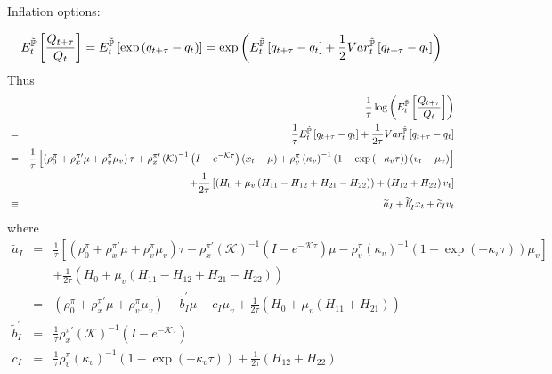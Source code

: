 \documentclass{article}
\begin{document}
Inflation options:

\begin{equation*}
E_{t}^{\mathbb{\tilde{P}}}\left[ \frac{Q_{t+\tau }}{Q_{t}}\right] =E_{t}^{%
\mathbb{\tilde{P}}}\left[ \exp \left( q_{t+\tau }-q_{t}\right) \right] =\exp
\left( E_{t}^{\mathbb{\tilde{P}}}\left[ q_{t+\tau }-q_{t}\right] +\frac{1}{2}%
Var_{t}^{\mathbb{\tilde{P}}}\left[ q_{t+\tau }-q_{t}\right] \right) 
\end{equation*}%
Thus%
\begin{eqnarray*}
&&\frac{1}{\tau }\log \left( E_{t}^{\mathbb{\tilde{P}}}\left[ \frac{%
Q_{t+\tau }}{Q_{t}}\right] \right)  \\
&=&\frac{1}{\tau }E_{t}^{\mathbb{\tilde{P}}}\left[ q_{t+\tau }-q_{t}\right] +%
\frac{1}{2\tau }Var_{t}^{\mathbb{\tilde{P}}}\left[ q_{t+\tau }-q_{t}\right] 
\\
&=&\frac{1}{\tau }\left[ \left( \rho _{0}^{\pi }+\rho _{x}^{\pi \prime }\mu
+\rho _{v}^{\pi }\mu _{v}\right) \tau +\rho _{x}^{\pi \prime }\left( 
\mathcal{K}\right) ^{-1}\left( I-e^{-\mathcal{K}\tau }\right) \left(
x_{t}-\mu \right) +\rho _{v}^{\pi }\left( \kappa _{v}\right) ^{-1}\left(
1-\exp \left( -\kappa _{v}\tau \right) \right) \left( v_{t}-\mu _{v}\right) %
\right]  \\
&&+\frac{1}{2\tau }\left[ \left( H_{0}+\mu _{v}\left(
H_{11}-H_{12}+H_{21}-H_{22}\right) \right) +\left( H_{12}+H_{22}\right) v_{t}%
\right]  \\
&\equiv &\widetilde{a}_{I}+\widetilde{b}_{I}^{\prime }x_{t}+\widetilde{c}%
_{I}v_{t}
\end{eqnarray*}%
where%
\begin{eqnarray*}
\widetilde{a}_{I} &=&\frac{1}{\tau }\left[ \left( \rho _{0}^{\pi }+\rho
_{x}^{\pi \prime }\mu +\rho _{v}^{\pi }\mu _{v}\right) \tau -\rho _{x}^{\pi
\prime }\left( \mathcal{K}\right) ^{-1}\left( I-e^{-\mathcal{K}\tau }\right)
\mu -\rho _{v}^{\pi }\left( \kappa _{v}\right) ^{-1}\left( 1-\exp \left(
-\kappa _{v}\tau \right) \right) \mu _{v}\right]  \\
&&+\frac{1}{2\tau }\left( H_{0}+\mu _{v}\left(
H_{11}-H_{12}+H_{21}-H_{22}\right) \right)  \\
&=&\left( \rho _{0}^{\pi }+\rho _{x}^{\pi \prime }\mu +\rho _{v}^{\pi }\mu
_{v}\right) -\widetilde{b}_{I}^{\prime }\mu -c_{I}\mu _{v}+\frac{1}{2\tau }%
\left( H_{0}+\mu _{v}\left( H_{11}+H_{21}\right) \right)  \\
\widetilde{b}_{I}^{\prime } &=&\frac{1}{\tau }\rho _{x}^{\pi \prime }\left( 
\mathcal{K}\right) ^{-1}\left( I-e^{-\mathcal{K}\tau }\right)  \\
\widetilde{c}_{I} &=&\frac{1}{\tau }\rho _{v}^{\pi }\left( \kappa
_{v}\right) ^{-1}\left( 1-\exp \left( -\kappa _{v}\tau \right) \right) +%
\frac{1}{2\tau }\left( H_{12}+H_{22}\right) 
\end{eqnarray*}
\end{document}
